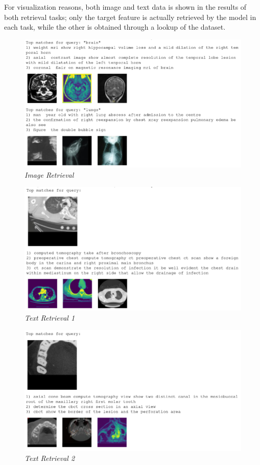 \documentclass[10pt,twocolumn,letterpaper]{article}
\begin{document}
For visualization reasons, both image and text data is shown in the results of both retrieval tasks; only the target feature is actually retrieved by the model in each task, while the other is obtained through a lookup of the dataset.

\begin{figure}[H]
    \centering
    \includegraphics[width=1\linewidth]{img/T2I_test1.png}
    \caption{\textit{Image Retrieval}}
\end{figure}

\begin{figure}[H]
   \centering
   \includegraphics[width=1\linewidth]{img/I2T_test1.png}
   \caption{\textit{Text Retrieval 1}}
\end{figure}
\begin{figure}[H]
   \centering
   \includegraphics[width=1\linewidth]{img/I2T_test2.png}
   \caption{\textit{Text Retrieval 2}}
\end{figure}
\end{document}
